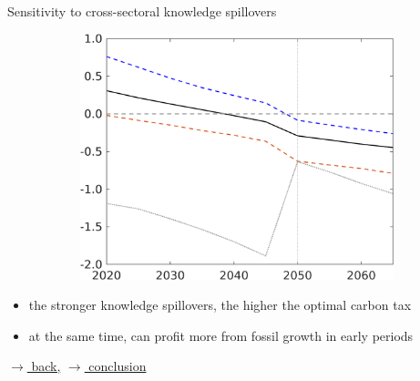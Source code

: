 \documentclass[11pt,aspectratio=169]{beamer}
\begin{document}
\begin{frame}{Sensitivity to cross-sectoral knowledge spillovers}
\begin{figure}[h!!]
\begin{subfigure}{0.45\textwidth}
\includegraphics[width=1\textwidth]{../codding_model/own_basedOnFried/optimalPol_010922_revision/figures/all_13Sept22/NewCalib_Sens_TvsNoT_dTaulAvS_emnet1_Sun2_spillover0_knspil3_xgr0_nsk0_sep0_extern0_PV1_etaa0.79_lgd0.png}
\end{subfigure}
\end{figure}
\vspace{2mm}
\begin{block}{}
	\begin{itemize}
		\item the stronger knowledge spillovers, the higher the optimal carbon tax
		\item at the same time, can profit more from fossil growth in early periods
	\end{itemize}
\end{block}	

\vspace{-5mm}
\hfill
\hyperlink{backOPT}{\tiny{$\rightarrow$ back,}}	\hyperlink{conc}{\tiny{$\rightarrow$ conclusion}}
\end{frame}
\end{document}
